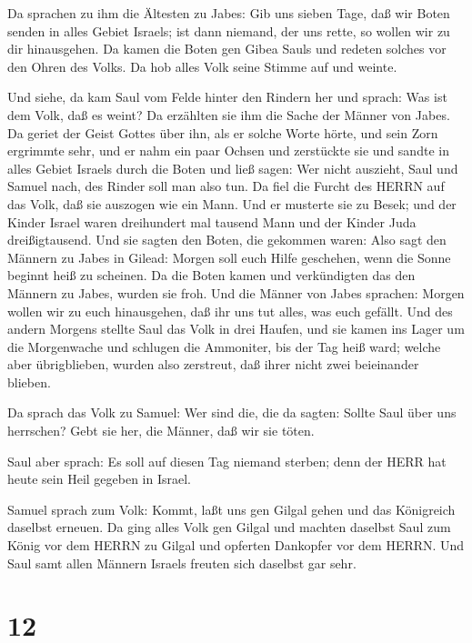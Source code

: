  Da sprachen zu ihm die Ältesten zu Jabes: Gib uns sieben
Tage, daß wir Boten senden in alles Gebiet Israels; ist dann niemand,
der uns rette, so wollen wir zu dir hinausgehen.  Da kamen
die Boten gen Gibea Sauls und redeten solches vor den Ohren des Volks.
Da hob alles Volk seine Stimme auf und weinte.

 Und siehe, da kam Saul vom Felde hinter den Rindern her und
sprach: Was ist dem Volk, daß es weint? Da erzählten sie ihm die Sache
der Männer von Jabes.  Da geriet der Geist Gottes über ihn,
als er solche Worte hörte, und sein Zorn ergrimmte sehr, 
und er nahm ein paar Ochsen und zerstückte sie und sandte in alles
Gebiet Israels durch die Boten und ließ sagen: Wer nicht auszieht, Saul
und Samuel nach, des Rinder soll man also tun. Da fiel die Furcht des
HERRN auf das Volk, daß sie auszogen wie ein Mann.  Und er
musterte sie zu Besek; und der Kinder Israel waren dreihundert mal
tausend Mann und der Kinder Juda dreißigtausend.  Und sie
sagten den Boten, die gekommen waren: Also sagt den Männern zu Jabes in
Gilead: Morgen soll euch Hilfe geschehen, wenn die Sonne beginnt heiß zu
scheinen. Da die Boten kamen und verkündigten das den Männern zu Jabes,
wurden sie froh.  Und die Männer von Jabes sprachen: Morgen
wollen wir zu euch hinausgehen, daß ihr uns tut alles, was euch gefällt.
 Und des andern Morgens stellte Saul das Volk in drei
Haufen, und sie kamen ins Lager um die Morgenwache und schlugen die
Ammoniter, bis der Tag heiß ward; welche aber übrigblieben, wurden also
zerstreut, daß ihrer nicht zwei beieinander blieben.

 Da sprach das Volk zu Samuel: Wer sind die, die da sagten:
Sollte Saul über uns herrschen? Gebt sie her, die Männer, daß wir sie
töten.

 Saul aber sprach: Es soll auf diesen Tag niemand sterben;
denn der HERR hat heute sein Heil gegeben in Israel.

 Samuel sprach zum Volk: Kommt, laßt uns gen Gilgal gehen
und das Königreich daselbst erneuen.  Da ging alles Volk
gen Gilgal und machten daselbst Saul zum König vor dem HERRN zu Gilgal
und opferten Dankopfer vor dem HERRN. Und Saul samt allen Männern
Israels freuten sich daselbst gar sehr.

\hypertarget{section-11}{%
\section{12}\label{section-11}}

